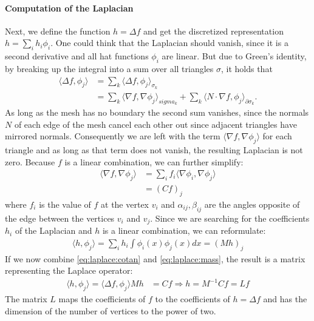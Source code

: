 \paragraph{Computation of the Laplacian}
Next, we define the function $h = \Delta f$ and get the discretized representation $h = \sum_i h_i \phi_i$.
One could think that the Laplacian should vanish, since it is a second derivative and all hat functions $\phi_i$ are linear.
But due to Green's identity, by breaking up the integral into a sum over all triangles $\sigma$, it holds that
\begin{align}
	\langle \Delta f, \phi_j \rangle &= \sum_{k} \langle \Delta f, \phi_j \rangle_{\sigma_k} \\
	&= \sum_{k} \langle \nabla f, \nabla \phi_j \rangle_{sigma_k} + \sum_{k} \langle N \cdot \nabla f, \phi_j \rangle_{\partial \sigma_k}.
\end{align}
As long as the mesh has no boundary the second sum vanishes, since the normals $N$ of each edge of the mesh cancel each other out since adjacent triangles have mirrored normals.
Consequently we are left with the term $\langle \nabla f, \nabla \phi_j \rangle$ for each triangle and as long as that term does not vanish, the resulting Laplacian is not zero.
Because $f$ is a linear combination, we can further simplify:
\begin{align}
	\langle \nabla f, \nabla \phi_j \rangle &= \sum_i f_i \langle \nabla \phi_i, \nabla \phi_j \rangle \\
	& = (Cf)_j
	\label{eq:laplace:cotan}
\end{align}
where $f_i$ is the value of $f$ at the vertex $v_i$ and $\alpha_{ij},\beta_{ij}$ are the angles opposite of the edge between the vertices $v_i$ and $v_j$.
Since we are searching for the coefficients $h_i$ of the Laplacian and $h$ is a linear combination, we can reformulate:
\begin{align}
	\langle h, \phi_j \rangle = \sum_i h_i \int \phi_i(x) \phi_j(x) dx = (Mh)_j
	\label{eq:laplace:mass}
\end{align}
If we now combine \eqref{eq:laplace:cotan} and \eqref{eq:laplace:mass}, the result is a matrix representing the Laplace operator:
\begin{align}
	\langle h, \phi_j \rangle = \langle \Delta f, \phi_j \rangle
	Mh &= Cf \Rightarrow h = M^{-1}Cf = Lf
	\label{eq:laplace:final}
\end{align}
The matrix $L$ maps the coefficients of $f$ to the coefficients of $h = \Delta f$ and has the dimension of the number of vertices to the power of two.

